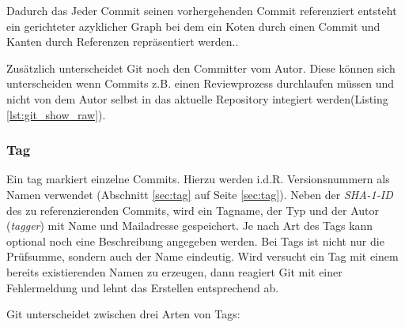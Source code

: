 Dadurch das Jeder Commit seinen vorhergehenden Commit referenziert entsteht ein
gerichteter azyklicher Graph bei dem ein Koten durch einen Commit und Kanten
durch Referenzen repräsentiert werden.\cite[57]{gitops}.



Zusätzlich unterscheidet Git noch den Committer vom Autor. Diese können sich
unterscheiden wenn Commits z.B. einen Reviewprozess durchlaufen müssen und
nicht von dem Autor selbst in das aktuelle Repository integiert werden(Listing
\ref{lst:git_show_raw}).

\subsubsection{Tag}\label{sec:tagobject}
Ein \gls{tag} markiert einzelne Commits. Hierzu werden i.d.R. Versionsnummern
als Namen verwendet (Abschnitt \ref{sec:tag} auf Seite \ref{sec:tag}). Neben
der \textit{SHA-1-ID} des zu referenzierenden Commits, wird ein Tagname, der
Typ und der Autor (\textit{tagger}) mit Name und Mailadresse gespeichert. Je
nach Art des Tags kann optional noch eine Beschreibung angegeben werden. Bei
Tags ist nicht nur die Prüfsumme, sondern auch der Name eindeutig. Wird
versucht ein Tag mit einem bereits existierenden Namen zu erzeugen, dann
reagiert Git mit einer Fehlermeldung und lehnt das Erstellen entsprechend ab.

Git unterscheidet zwischen drei Arten von Tags:

